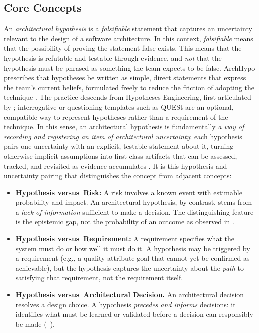\subsection{Core Concepts}
\label{subsec:archhypo-core}

An \emph{architectural hypothesis} is a \emph{falsifiable} statement that captures an uncertainty relevant to the design of a software architecture.
In this context, \emph{falsifiable} means that the possibility of proving the statement false exists. This means that the hypothesis is refutable and testable through evidence, and \emph{not} that the hypothesis must be phrased as something the team expects to be false.
ArchHypo prescribes that hypotheses be written as simple, direct statements that express the team's current beliefs, formulated freely to reduce the friction of adopting the technique \citep{silva2024tse}.
The practice descends from Hypotheses Engineering, first articulated by \citet{melegati2019he}; interrogative or questioning templates such as QUESt \citep{melegati2019quest} are an optional, compatible way to represent hypotheses rather than a requirement of the technique.
In this sense, an architectural hypothesis is fundamentally \emph{a way of recording and registering an item of architectural uncertainty}: each hypothesis pairs one uncertainty with an explicit, testable statement about it, turning otherwise implicit assumptions into first-class artifacts that can be assessed, tracked, and revisited as evidence accumulates \citep{silva2024tse}.
It is this hypothesis and uncertainty pairing that distinguishes the concept from adjacent concepts:

\begin{itemize}
  \item \textbf{Hypothesis versus\ Risk:} A risk involves a known event with estimable
  probability and impact. An architectural hypothesis, by contrast, stems from a \emph{lack of information} sufficient to make a decision. 
  The distinguishing feature is the epistemic gap, not the probability of an outcome as observed in \citet{silva2024tse}.

  \item \textbf{Hypothesis versus\ Requirement:} A requirement specifies what the system
  must do or how well it must do it. A hypothesis may be triggered by a requirement
  (e.g., a quality-attribute goal that cannot yet be confirmed as achievable), but the
  hypothesis captures the uncertainty about the \emph{path} to satisfying that
  requirement, not the requirement itself.

  \item \textbf{Hypothesis versus\ Architectural Decision.} An architectural decision
  resolves a design choice. A hypothesis \emph{precedes and informs} decisions: it
  identifies what must be learned or validated before a decision can responsibly be
  made (~\citep{silva2024tse}).
\end{itemize}

